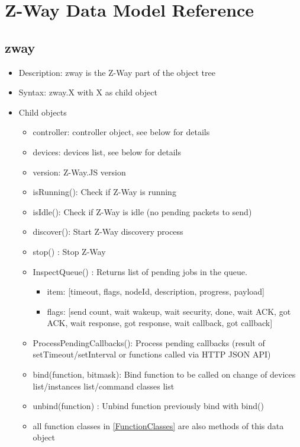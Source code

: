 \chapter{Z-Way Data Model Reference}
\label{datamodel}

\section{zway}

\begin {itemize}
\item Description: zway is the Z-Way part of the object tree
\item Syntax:  zway.X with  X as child object
\item Child objects
\begin {itemize}
\item controller: controller object, see below for details
\item devices: devices list, see below for details
\item version: Z-Way.JS version
\item isRunning(): Check if Z-Way is running
\item isIdle(): Check if Z-Way is idle (no pending packets to send)
\item discover(): Start Z-Way discovery process
\item stop() : Stop Z-Way
\item InspectQueue() : Returns list of pending jobs in the queue.
\begin {itemize}
\item item: [timeout, flags, nodeId, description, progress, payload]
\item flags: [send count, wait wakeup, wait security, done, wait ACK, got ACK, wait response, got response, wait callback, got callback]
\end {itemize}
\item ProcessPendingCallbacks(): Process pending callbacks (result of setTimeout/setInterval or functions called via HTTP JSON API)
\item bind(function, bitmask): Bind function to be called on change of devices list/instances list/command classes list
\item unbind(function) : Unbind function previously bind with bind()
\item all function classes in \ref{FunctionClasses} are also methods of this data object
\end {itemize}
\end {itemize}

